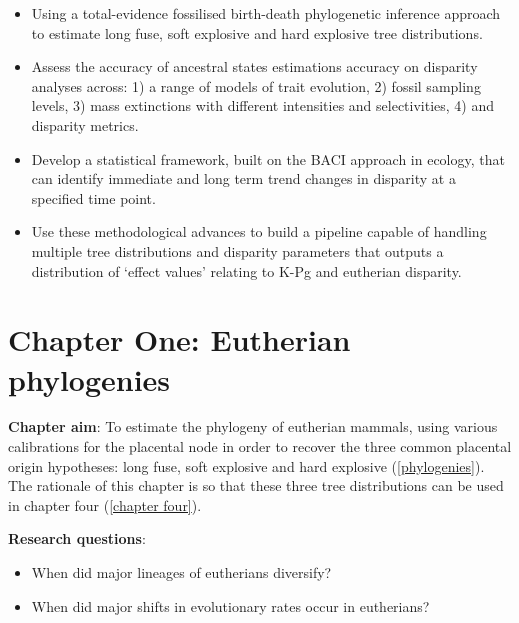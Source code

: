 \documentclass[titlepage]{article}
\begin{document}
\begin{itemize}
    \item Using a total-evidence fossilised birth-death phylogenetic inference approach to estimate long fuse, soft explosive and hard explosive tree distributions.
    \item Assess the accuracy of ancestral states estimations accuracy on disparity analyses across: 1) a range of models of trait evolution, 2) fossil sampling levels, 3) mass extinctions with different intensities and selectivities, 4) and disparity metrics.
    \item Develop a statistical framework, built on the BACI approach in ecology, that can identify immediate and long term trend changes in disparity at a specified time point. %
    \item Use these methodological advances to build a pipeline capable of handling multiple tree distributions and disparity parameters that outputs a distribution of `effect values' relating to K-Pg and eutherian disparity. %
\end{itemize}

\section{Chapter One: Eutherian phylogenies}
\textbf{Chapter aim}: To estimate %
 the phylogeny of eutherian mammals, using various calibrations for the placental node in order to recover the three common placental origin hypotheses: long fuse, soft explosive and hard explosive (\autoref{phylogenies}). %
The rationale of this chapter is so that these three tree distributions can be used in chapter four (\autoref{chapter four}).

\noindent\textbf{Research questions}:
\begin{itemize}
    \item When did major lineages of eutherians diversify?
    \item When did major shifts in evolutionary rates occur in eutherians?
\end{itemize}
\end{document}
